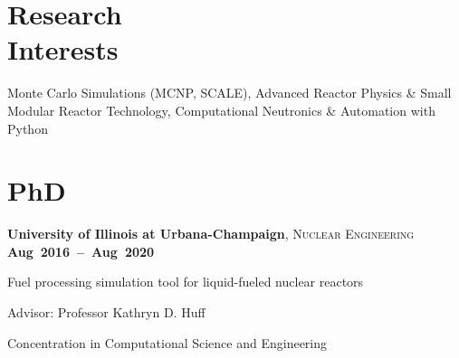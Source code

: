 \documentclass[margin,line]{resume}
\begin{document}
\begin{resume}
    \section{\mysidestyle Research\\Interests}
		Monte Carlo Simulations (MCNP, SCALE), Advanced Reactor Physics \& Small Modular Reactor Technology,
         Computational Neutronics \& Automation with Python
    \section{\mysidestyle PhD}
    \textbf{University of Illinois at Urbana-Champaign}, \textsc{Nuclear 
    Engineering} \hfill\textbf{\mbox{Aug 2016 -- Aug 2020}}\vspace{-3mm}\\\vspace{-1mm}%
    \begin{list2}
        \item Fuel processing simulation tool for liquid-fueled nuclear reactors
        \item Advisor:  Professor Kathryn D. Huff
        \item Concentration in Computational Science and Engineering
    \end{list2}\vspace{-1.5mm}

\end{resume}
\end{document}
